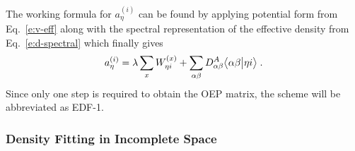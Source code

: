 \documentclass[aip,jcp,amsmath,amssymb,reprint,floatfix]{revtex4-1}
\begin{document}
%
%
The working formula for $a^{(i)}_\eta$ can be found by applying 
potential form from Eq.~\eqref{e:v-eff}
along with the spectral representation of the effective density from Eq.~\eqref{e:d-spectral} 
which finally gives
%
\begin{equation} \label{e:a-coeff-compl}
 a^{(i)}_\eta = \lambda \sum_{x} W_{\eta i}^{(x)} + 
 \sum_{\alpha\beta} D^A_{\alpha\beta} 
  \bigl\langle {\alpha\beta} \bigl\lvert {\eta i} \bigr\rangle \;.
\end{equation}
%
Since only one step is required to obtain the OEP matrix, the scheme will
be abbreviated as EDF-1.

\subsubsection{\label{sss:2.3.1.GDF-2}Density Fitting in Incomplete Space}
\end{document}

